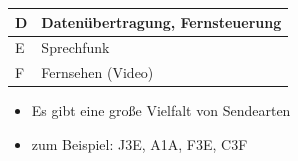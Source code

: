 \begin{frame}
\begin{tiny}
\begin{minipage}{0.4\textwidth}
\begin{tabular}{|l|l|}
		D & Datenübertragung, Fernsteuerung\\ \hline
		E & Sprechfunk \\ \hline
		F & Fernsehen (Video)\\ \hline	
	\end{tabular}
\end{minipage}
\end{tiny}
\vspace{0.5cm}
\begin{itemize}
	\item Es gibt eine große Vielfalt von Sendearten
	\item zum Beispiel: J3E, A1A, F3E, C3F
\end{itemize}
\end{frame}


